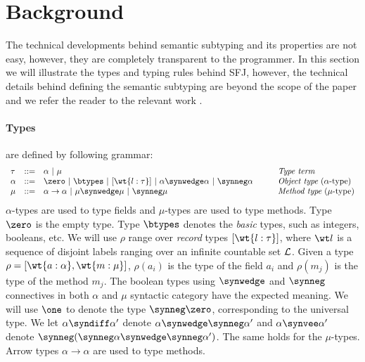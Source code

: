 \section{Background}
\label{sec:background}
The technical developments behind semantic subtyping and its properties are not easy, however, they are completely transparent to the programmer.
In this section we will illustrate the types and typing rules behind SFJ, however, the technical details behind defining the semantic subtyping are beyond the scope of the paper and we refer the reader to the relevant work \cite{Dardha2013,Dardha2017}.

\paragraph{Types} are defined by following grammar:
$$
\begin{array}{llll}
\tau & ::= & \alpha \ |\ \mu
& \mbox{{\em Type term}}
\\
\alpha & ::=  & \zero \ |\ \btypes \ |\ [\wt{l:\tau}] \ |\ \alpha \synwedge \alpha \ |\ \synneg\alpha
\qquad
& \mbox{{\em Object type} ($\alpha $-type)}
\\
\mu & ::=  & \alpha \to \alpha \ |\ \mu \synwedge \mu \ |\ \synneg\mu
& \mbox{{\em Method type} ($\mu $-type)}
\end{array}
$$
$\alpha$-types are used to type fields and $\mu$-types are used to type methods.
Type $\zero$ is the empty type.
Type $\btypes$ denotes the \emph{basic} types, such as integers, booleans, etc.
We will use $\rho$ range over \emph{record} types $[\wt{l:\tau}]$, where $\wt l$ is a sequence of disjoint labels ranging over an infinite countable set ${\cal L}$.
Given a type $\rho = [\wt{a:\alpha},\wt{m:\mu}]$, $\rho(a_i)$ is the type of the field $a_i$ and $\rho(m_j)$ is the type of the method $m_j$.
The boolean types using $\synwedge$ and $\synneg$ connectives in both $\alpha$ and $\mu$ syntactic category have the expected meaning.
We will use $\one$ to denote the type $\synneg \zero$, corresponding to the universal type. We let $\alpha \syndiff \alpha'$  denote $\alpha \synwedge \synneg \alpha'$ and $\alpha \synvee \alpha'$  denote $\synneg(\synneg \alpha \synwedge \synneg \alpha')$. The same holds for the $\mu$-types.
Arrow types $\alpha \to \alpha$ are used to type methods.


